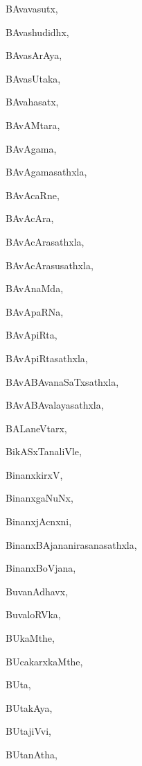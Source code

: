 \begin{multicols}{2}
{BAvavasutx}, \pageref{BAvavasutx}

{BAvashudidhx}, \pageref{BAvashudidhx}

{BAvasArAya}, \pageref{BAvasArAya}

{BAvasUtaka}, \pageref{BAvasUtaka}

{BAvahasatx}, \pageref{BAvahasatx}

{BAvAMtara}, \pageref{BAvAMtara}

{BAvAgama}, \pageref{BAvAgama}

{BAvAgamasathxla}, \pageref{BAvAgamasathxla}

{BAvAcaRne}, \pageref{BAvAcaRne}

{BAvAcAra}, \pageref{BAvAcAra}

{BAvAcArasathxla}, \pageref{BAvAcArasathxla}

{BAvAcArasusathxla}, \pageref{BAvAcArasusathxla}

{BAvAnaMda}, \pageref{BAvAnaMda}

{BAvApaRNa}, \pageref{BAvApaRNa}

{BAvApiRta}, \pageref{BAvApiRta}

{BAvApiRtasathxla}, \pageref{BAvApiRtasathxla}

{BAvABAvanaSaTxsathxla}, \pageref{BAvABAvanaSaTxsathxla}

{BAvABAvalayasathxla}, \pageref{BAvABAvalayasathxla}

{BALaneVtarx}, \pageref{BALaneVtarx}

{BikASxTanaliVle}, \pageref{BikASxTanaliVle}

{BinanxkirxV}, \pageref{BinanxkirxV}

{BinanxgaNuNx}, \pageref{BinanxgaNuNx}

{BinanxjAcnxni}, \pageref{BinanxjAcnxni}

{BinanxBAjananirasanasathxla}, \pageref{BinanxBAjananirasanasathxla}

{BinanxBoVjana}, \pageref{BinanxBoVjana}

{BuvanAdhavx}, \pageref{BuvanAdhavx}

{BuvaloRVka}, \pageref{BuvaloRVka}

{BUkaMthe}, \pageref{BUkaMthe}

{BUcakarxkaMthe}, \pageref{BUcakarxkaMthe}

{BUta}, \pageref{BUta}

{BUtakAya}, \pageref{BUtakAya}

{BUtajiVvi}, \pageref{BUtajiVvi}

{BUtanAtha}, \pageref{BUtanAtha}


\end{multicols}
